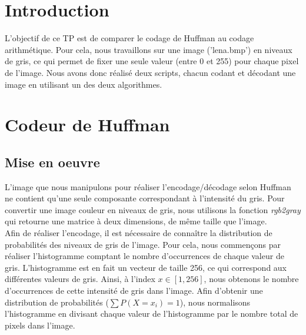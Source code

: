 \documentclass[a4paper, 12pt]{article}
\begin{document}






\clearpage

\section{Introduction}
L'objectif de ce TP est de comparer le codage de Huffman au codage arithmétique. Pour cela, nous travaillons sur une image ('lena.bmp') en niveaux de gris, ce qui permet de fixer une seule valeur (entre 0 et 255) pour chaque pixel de l'image. Nous avons donc réalisé deux scripts, chacun codant et décodant une image en utilisant un des deux algorithmes.

\section{Codeur de Huffman}

\subsection{Mise en oeuvre}

L'image que nous manipulons pour réaliser l'encodage/décodage selon Huffman ne contient qu'une seule composante correspondant à l'intensité du gris. Pour convertir une image couleur en niveaux de gris, nous utilisons la fonction \textit{rgb2gray} qui retourne une matrice à deux dimensions, de même taille que l'image.\\

Afin de réaliser l'encodage, il est nécessaire de connaître la distribution de probabilités des niveaux de gris de l'image. Pour cela, nous commençons par réaliser l'histogramme comptant le nombre d'occurrences de chaque valeur de gris. L'histogramme est en fait un vecteur de taille 256, ce qui correspond aux différentes valeurs de gris. Ainsi, à l'index $x\in[1, 256]$, nous obtenons le nombre d’occurrences de cette intensité de gris dans l'image. Afin d'obtenir une distribution de probabilités ($\sum P(X=x_{i}) = 1$), nous normalisons l'histogramme en divisant chaque valeur de l'histogramme par le nombre total de pixels dans l'image. \\
\end{document}
